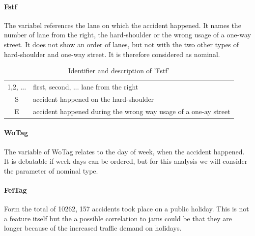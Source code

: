\documentclass[a4paper,headsepline,footsepline,fontsize=11pt,BCOR=12mm,DIV=12]{report}
\begin{document}
\paragraph{Fstf}
The variabel references the lane on which the accident happened. It names the number of lane from the right, the hard-shoulder or the wrong usage of a one-way street. It does not show an order of lanes, but not with the two other types of hard-shoulder and one-way street. It is therefore considered as nominal.
\noindent
\begin{table}[h!]
	\centering
	\begin{tabular}{c|l}  
		1,2, ... & first, second, ... lane from the right \\ 
 		S & accident happened on the hard-shoulder \\ 
 		E & accident happened during the wrong way usage of a one-ay street \\
	\end{tabular}
	\caption{Identifier and description of 'Fstf'}
	\label{table:baysis_dataset_Fstf}
\end{table}
    
\paragraph{WoTag}
The variable of WoTag relates to the day of week, when the accident happened. It is debatable if week days can be ordered, but for this analysis we will consider the parameter of nominal type.

\paragraph{FeiTag}
Form the total of 10262, 157 accidents took place on a public holiday. This is not a feature itself but the a possible correlation to jams could be that they are longer because of the increased traffic demand on holidays.

\bigskip
	
\end{document}

